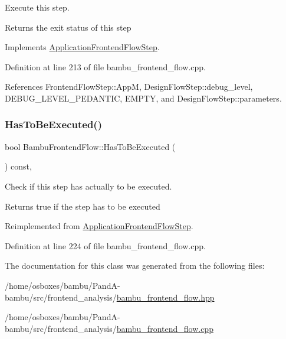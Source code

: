 Execute this step. 

\begin{DoxyReturn}{Returns}
the exit status of this step 
\end{DoxyReturn}


Implements \hyperlink{classApplicationFrontendFlowStep_a2bf060a5ebc1735635dc5c7773387a25}{Application\+Frontend\+Flow\+Step}.



Definition at line 213 of file bambu\+\_\+frontend\+\_\+flow.\+cpp.



References Frontend\+Flow\+Step\+::\+AppM, Design\+Flow\+Step\+::debug\+\_\+level, D\+E\+B\+U\+G\+\_\+\+L\+E\+V\+E\+L\+\_\+\+P\+E\+D\+A\+N\+T\+IC, E\+M\+P\+TY, and Design\+Flow\+Step\+::parameters.

\mbox{\label{classBambuFrontendFlow_a44511aa9719eca10142e1e736dec5f08}} 
\subsubsection{\texorpdfstring{Has\+To\+Be\+Executed()}{HasToBeExecuted()}}
{\footnotesize\ttfamily bool Bambu\+Frontend\+Flow\+::\+Has\+To\+Be\+Executed (\begin{DoxyParamCaption}{ }\end{DoxyParamCaption}) const\hspace{0.3cm}{\ttfamily [override]}, {\ttfamily [virtual]}}



Check if this step has actually to be executed. 

\begin{DoxyReturn}{Returns}
true if the step has to be executed 
\end{DoxyReturn}


Reimplemented from \hyperlink{classApplicationFrontendFlowStep_ad99f4dcbab470c65eea79ae0291a4bd5}{Application\+Frontend\+Flow\+Step}.



Definition at line 224 of file bambu\+\_\+frontend\+\_\+flow.\+cpp.



The documentation for this class was generated from the following files\+:\begin{DoxyCompactItemize}
\item 
/home/osboxes/bambu/\+Pand\+A-\/bambu/src/frontend\+\_\+analysis/\hyperlink{bambu__frontend__flow_8hpp}{bambu\+\_\+frontend\+\_\+flow.\+hpp}\item 
/home/osboxes/bambu/\+Pand\+A-\/bambu/src/frontend\+\_\+analysis/\hyperlink{bambu__frontend__flow_8cpp}{bambu\+\_\+frontend\+\_\+flow.\+cpp}\end{DoxyCompactItemize}
